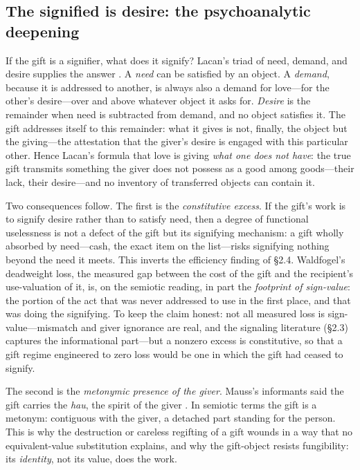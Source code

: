 \documentclass[11pt,a4paper]{article}
\begin{document}
\subsection{The signified is desire: the psychoanalytic deepening}
\label{p04:sec:lacan}
If the gift is a signifier, what does it signify? Lacan's triad of need,
demand, and desire supplies the answer \parencite{lacan2006}. A \emph{need} can
be satisfied by an object. A \emph{demand}, because it is addressed to
another, is always also a demand for love---for the other's desire---over and
above whatever object it asks for. \emph{Desire} is the remainder when need
is subtracted from demand, and no object satisfies it. The gift addresses
itself to this remainder: what it gives is not, finally, the object but the
giving---the attestation that the giver's desire is engaged with this
particular other. Hence Lacan's formula that love is giving \emph{what one
does not have}: the true gift transmits something the giver does not possess
as a good among goods---their lack, their desire---and no inventory of
transferred objects can contain it.

Two consequences follow. The first is the \emph{constitutive excess}. If the
gift's work is to signify desire rather than to satisfy need, then a degree
of functional uselessness is not a defect of the gift but its signifying
mechanism: a gift wholly absorbed by need---cash, the exact item on the
list---risks signifying nothing beyond the need it meets. This inverts the
efficiency finding of \S2.4. Waldfogel's deadweight loss, the measured gap
between the cost of the gift and the recipient's use-valuation of it, is, on
the semiotic reading, in part the \emph{footprint of sign-value}: the
portion of the act that was never addressed to use in the first place, and
that was doing the signifying. To keep the claim honest: not all measured
loss is sign-value---mismatch and giver ignorance are real, and the
signaling literature (\S2.3) captures the informational part---but a nonzero
excess is constitutive, so that a gift regime engineered to zero loss would
be one in which the gift had ceased to signify.

The second is the \emph{metonymic presence of the giver}. Mauss's informants
said the gift carries the \emph{hau}, the spirit of the giver
\parencite{mauss1925}. In semiotic terms the gift is a metonym: contiguous with
the giver, a detached part standing for the person. This is why the
destruction or careless regifting of a gift wounds in a way that no
equivalent-value substitution explains, and why the gift-object resists
fungibility: its \emph{identity}, not its value, does the work.
\end{document}
